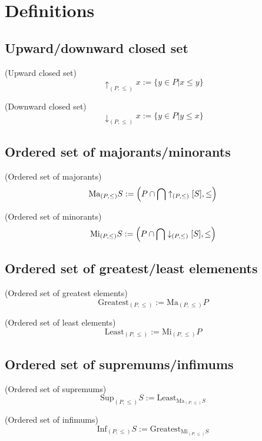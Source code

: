 \def\topic{Supremum \& Infimum}


\section{Definitions}
\subsection{Upward/downward closed set}
\begin{definition}(Upward closed set)
\[
\uparrow_{(P,\leq)}x:=\{y\in P|x\leq y\}
\]
\end{definition}
\begin{definition}(Downward closed set)
\[
\downarrow_{(P,\leq)}x:=\{y\in P|y\leq x\}
\]
\end{definition}

\subsection{Ordered set of majorants/minorants}
\begin{definition}(Ordered set of majorants)
\[
\mathrm{Ma}_{(P,\leq)}S:=\left(P\cap\bigcap \uparrow_{(P,\leq)}[S],\leq\right)
\]
\end{definition}
\begin{definition}(Ordered set of minorants)
\[
\mathrm{Mi}_{(P,\leq)}S:=\left(P\cap\bigcap \downarrow_{(P,\leq)}[S],\leq\right)
\]
\end{definition}
\subsection{Ordered set of greatest/least elemenents}
\begin{definition}(Ordered set of greatest elements)
\[
\mathrm{Greatest}_{(P,\leq)}:=\mathrm{Ma}_{(P,\leq)}P
\]
\end{definition}
\begin{definition}(Ordered set of least elements)
\[
\mathrm{Least}_{(P,\leq)}:=\mathrm{Mi}_{(P,\leq)}P
\]
\end{definition}
\subsection{Ordered set of supremums/infimums}
\begin{definition}(Ordered set of supremums)
\[
\mathrm{Sup}_{(P,\leq)}S:=\mathrm{Least}_{\mathrm{Ma}_{(P,\leq)}S}
\]
\end{definition}
\begin{definition}(Ordered set of infimums)
\[
\mathrm{Inf}_{(P,\leq)}S:=\mathrm{Greatest}_{\mathrm{Mi}_{(P,\leq)}S}
\]
\end{definition}




